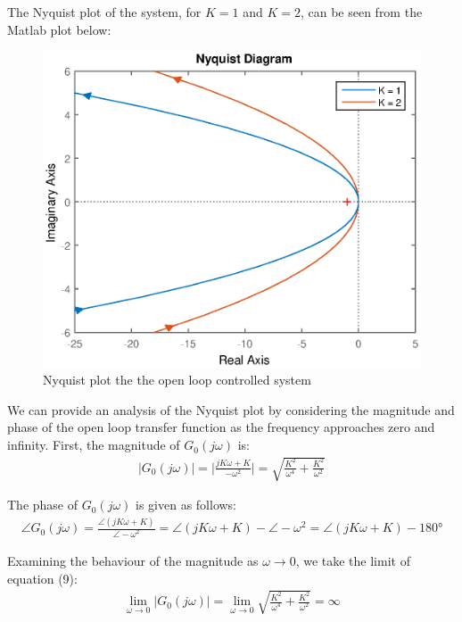 \documentclass{article}
\begin{document}
    The Nyquist plot of the system, for $K=1$ and $K=2$, can be seen from the Matlab plot below:
    \begin{figure}[h]
    	\centering
    	\includegraphics[scale=0.5]{fig2.eps}
    	\caption{Nyquist plot the the open loop controlled system}
    \end{figure}
	
	We can provide an analysis of the Nyquist plot by considering the magnitude and phase of the open loop transfer function as the frequency approaches zero and infinity. First, the magnitude of $G_0(j \omega)$ is:
	\begin{align}
		|G_0(j \omega)| = \bigg|\frac{jK \omega + K}{- \omega^2}\bigg| = \sqrt{\frac{K^2}{\omega^4} + \frac{K^2}{\omega^2}}
	\end{align}
	
	The phase of $G_0(j \omega)$ is given as follows:
	\begin{align}
		\angle G_0(j \omega) = \frac{\angle (jK \omega + K)}{\angle - \omega^2} = \angle (jK \omega + K) - \angle - \omega^2 = \angle (jK \omega + K) - 180 \si{\degree}
	\end{align}
	
	Examining the behaviour of the magnitude as $\omega \to 0$, we take the limit of equation (9):
	\begin{align*}
	\lim_{\omega\to 0}|G_0(j \omega)| = \lim_{\omega\to 0}\sqrt{\frac{K^2}{\omega^4} + \frac{K^2}{\omega^2}} = \infty
	\end{align*}
	
\end{document}
